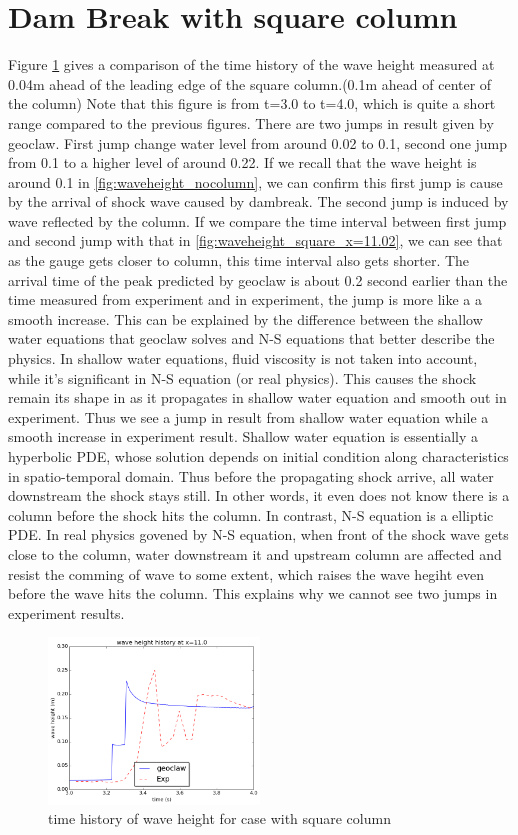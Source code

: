 \documentclass[11pt]{article}
\begin{document}
\section{Dam Break with square column}\label{Sec:Square}
Figure \ref{fig:waveheight_square_x=11.0} gives a comparison of the time history of the wave height measured at 0.04m ahead of the leading edge of the square column.(0.1m ahead of center of the column)
Note that this figure is from t=3.0 to t=4.0, which is quite a short range compared to the previous figures.
There are two jumps in result given by geoclaw. First jump change water level from around 0.02 to 0.1, second one jump from 0.1 to a higher level of around 0.22.
If we recall that the wave height is around 0.1 in \ref{fig:waveheight_nocolumn}, we can confirm this first jump is cause by the arrival of shock wave caused by dambreak. The second jump is induced by wave reflected by the column.  
If we compare the time interval between first jump and second jump with that in \ref{fig:waveheight_square_x=11.02}, we can see that as the gauge gets closer to column, this time interval also gets shorter.
The arrival time of the peak predicted by geoclaw is about 0.2 second earlier than the time measured from experiment and in experiment, the jump is more like a a smooth increase. 
This can be explained by the difference between the shallow water equations that geoclaw solves and N-S equations that better describe the physics.
In shallow water equations, fluid viscosity is not taken into account, while it's significant in N-S equation (or real physics).
This causes the shock remain its shape in as it propagates in shallow water equation and smooth out in experiment.
Thus we see a jump in result from shallow water equation while a smooth increase in experiment result.
Shallow water equation is essentially a hyperbolic PDE, whose solution depends on initial condition along characteristics in spatio-temporal domain. 
Thus before the propagating shock arrive, all water downstream the shock stays still. In other words, it even does not know there is a column before the shock hits the column. In contrast, N-S equation is a elliptic PDE. 
In real physics govened by N-S equation, when front of the shock wave gets close to the column, water downstream it and upstream column are affected and resist the comming of wave to some extent, which raises the wave hegiht even before the wave hits the column.   
This explains why we cannot see two jumps in experiment results.
\begin{figure}[h!]
    \centering
    \includegraphics[width=0.5\textwidth]{./plots/waveheight_square_x11}
    \caption{time history of wave height for case with square column}
    \label{fig:waveheight_square_x=11.0}
\end{figure}
\end{document}

